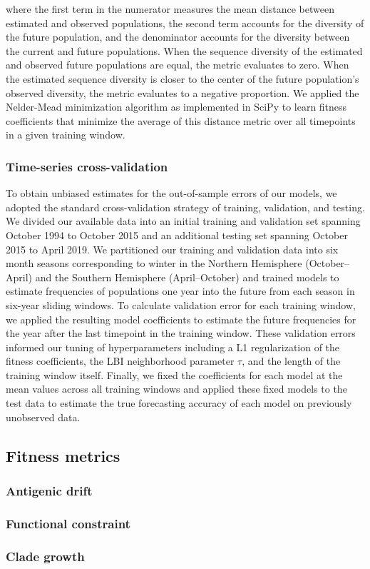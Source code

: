 where the first term in the numerator measures the mean distance between estimated and observed populations, the second term accounts for the diversity of the future population, and the denominator accounts for the diversity between the current and future populations.
When the sequence diversity of the estimated and observed future populations are equal, the metric evaluates to zero.
When the estimated sequence diversity is closer to the center of the future population's observed diversity, the metric evaluates to a negative proportion.
We applied the Nelder-Mead minimization algorithm as implemented in SciPy \cite{SciPy} to learn fitness coefficients that minimize the average of this distance metric over all timepoints in a given training window.

\subsubsection*{Time-series cross-validation}

To obtain unbiased estimates for the out-of-sample errors of our models, we adopted the standard cross-validation strategy of training, validation, and testing.
We divided our available data into an initial training and validation set spanning October 1994 to October 2015 and an additional testing set spanning October 2015 to April 2019.
We partitioned our training and validation data into six month seasons corresponding to winter in the Northern Hemisphere (October--April) and the Southern Hemisphere (April--October) and trained models to estimate frequencies of populations one year into the future from each season in six-year sliding windows.
To calculate validation error for each training window, we applied the resulting model coefficients to estimate the future frequencies for the year after the last timepoint in the training window.
These validation errors informed our tuning of hyperparameters including a L1 regularization of the fitness coefficients, the LBI neighborhood parameter $\tau$, and the length of the training window itself.
Finally, we fixed the coefficients for each model at the mean values across all training windows and applied these fixed models to the test data to estimate the true forecasting accuracy of each model on previously unobserved data.

\subsection*{Fitness metrics}

\subsubsection*{Antigenic drift}

\subsubsection*{Functional constraint}

\subsubsection*{Clade growth}
